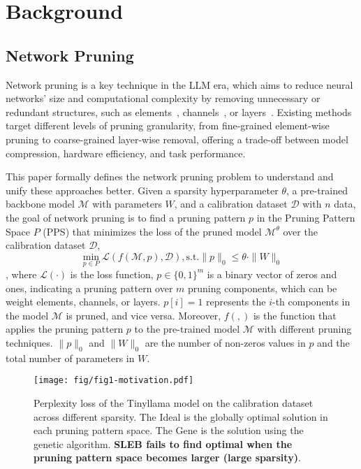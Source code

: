\section{Background}
\subsection{Network Pruning}
Network pruning is a key technique in the LLM era, which aims to reduce neural networks' size and computational complexity by removing unnecessary or redundant structures, such as elements~\cite{wanda}, channels~\cite{slicegpt}, or layers~\cite{sleb}. 
Existing methods target different levels of pruning granularity, from fine-grained element-wise pruning to coarse-grained layer-wise removal, offering a trade-off between model compression, hardware efficiency, and task performance. 

This paper formally defines the network pruning problem to understand and unify these approaches better.
Given a sparsity hyperparameter $\theta$, a pre-trained backbone model $\mathcal{M}$ with parameters $W$, and a calibration dataset $\mathcal{D}$ with $n$ data, the goal of network pruning is to find a pruning pattern $p$ in the Pruning Pattern Space $P$ (PPS) that minimizes the loss of the pruned model $\mathcal{M}^\theta$ over the calibration dataset $\mathcal{D}$,
\begin{equation}
    \min_{p\in P}\mathcal{L}(f(\mathcal{M}, p), \mathcal{D}), \text{s.t.} \|p\|_0 \leq \theta \cdot \|W\|_0
\end{equation}
, where $\mathcal{L}(\cdot)$ is the loss function, $p\in \{0, 1\}^m$ is a binary vector of zeros and ones, indicating a pruning pattern over $m$ pruning components, which can be weight elements, channels, or layers.
$p[i] = 1$ represents the $i$-th components in the model $\mathcal{M}$ is pruned, and vice versa.
Moreover, $f(, )$ is the function that applies the pruning pattern $p$ to the pre-trained model $\mathcal{M}$ with different pruning techniques.
$\|p\|_0$ and $\|W\|_0$ are the number of non-zeros values in $p$ and the total number of parameters in $W$.

\begin{figure}[t]
\centering
\texttt{[image: fig/fig1-motivation.pdf]}
\caption{Perplexity loss of the Tinyllama model on the calibration dataset across different sparsity. The Ideal is the globally optimal solution in each pruning pattern space. The Gene is the solution using the genetic algorithm. \textbf{SLEB fails to find optimal when the pruning pattern space becomes larger (large sparsity)}.}
\label{fig:ideal}
\end{figure}

